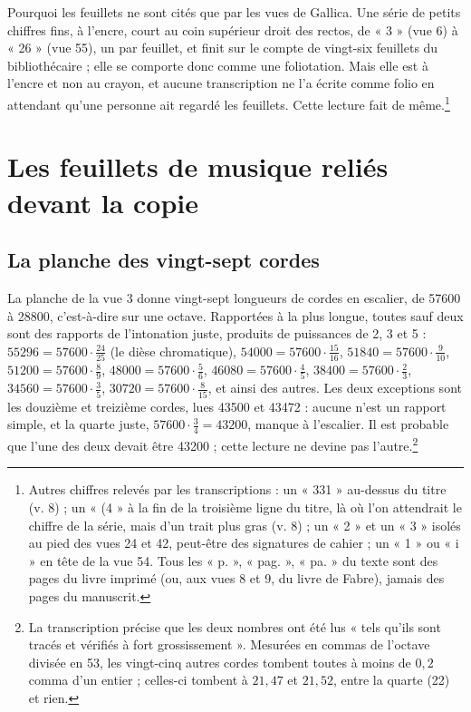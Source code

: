 \documentclass[11pt,a4paper]{article}
\begin{document}
Pourquoi les feuillets ne sont cités que par les vues de Gallica. Une série de
petits chiffres fins, à l'encre, court au coin supérieur droit des rectos, de
« 3 » (vue 6) à « 26 » (vue 55), un par feuillet, et finit sur le compte de
vingt-six feuillets du bibliothécaire ; elle se comporte donc comme une
foliotation. Mais elle est à l'encre et non au crayon, et aucune transcription
ne l'a écrite comme folio en attendant qu'une personne ait regardé les
feuillets. Cette lecture fait de même.\footnote{Autres chiffres relevés par les
transcriptions : un « 331 » au-dessus du titre (v. 8) ; un « (4 » à la fin de la
troisième ligne du titre, là où l'on attendrait le chiffre de la série, mais
d'un trait plus gras (v. 8) ; un « 2 » et un « 3 » isolés au pied des vues 24 et
42, peut-être des signatures de cahier ; un « 1 » ou « i » en tête de la vue 54.
Tous les « p. », « pag. », « pa. » du texte sont des pages du livre imprimé
(ou, aux vues 8 et 9, du livre de Fabre), jamais des pages du manuscrit.}

\section*{Les feuillets de musique reliés devant la copie}

\subsection*{La planche des vingt-sept cordes}

La planche de la vue 3 donne vingt-sept longueurs de cordes en escalier, de
57600 à 28800, c'est-à-dire sur une octave. Rapportées à la plus longue, toutes
sauf deux sont des rapports de l'intonation juste, produits de puissances de
2, 3 et 5 : $55296 = 57600 \cdot \frac{24}{25}$ (le dièse chromatique),
$54000 = 57600\cdot\frac{15}{16}$, $51840 = 57600\cdot\frac{9}{10}$,
$51200 = 57600\cdot\frac{8}{9}$, $48000 = 57600\cdot\frac56$,
$46080 = 57600\cdot\frac45$, $38400 = 57600\cdot\frac23$,
$34560 = 57600\cdot\frac35$, $30720 = 57600\cdot\frac{8}{15}$, et ainsi des
autres. Les deux exceptions sont les douzième et treizième cordes, lues 43500
et 43472 : aucune n'est un rapport simple, et la quarte juste,
$57600 \cdot \frac34 = 43200$, manque à l'escalier. Il est probable que l'une
des deux devait être 43200 ; cette lecture ne devine pas l'autre.\footnote{La
transcription précise que les deux nombres ont été lus « tels qu'ils sont
tracés et vérifiés à fort grossissement ». Mesurées en commas de l'octave
divisée en 53, les vingt-cinq autres cordes tombent toutes à moins de
$0{,}2$ comma d'un entier ; celles-ci tombent à $21{,}47$ et $21{,}52$, entre
la quarte (22) et rien.}
\end{document}
